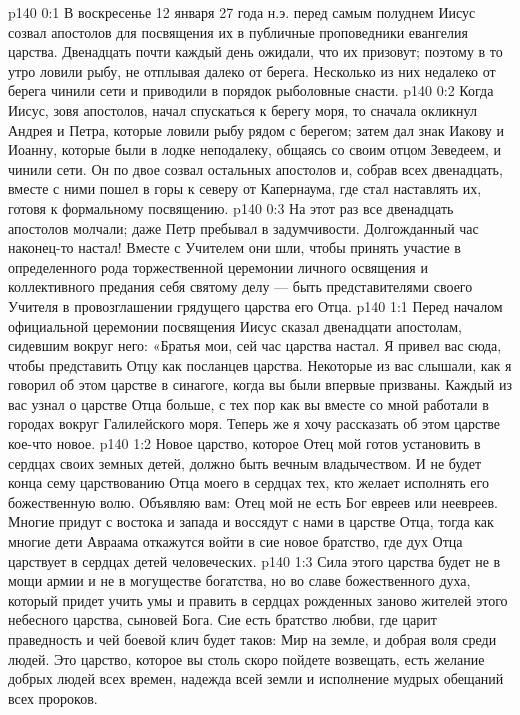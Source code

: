 \author{Комиссия срединников}
\vs p140 0:1 В воскресенье 12 января 27 года н.э. перед самым полуднем Иисус созвал апостолов для посвящения их в публичные проповедники евангелия царства. Двенадцать почти каждый день ожидали, что их призовут; поэтому в то утро ловили рыбу, не отплывая далеко от берега. Несколько из них недалеко от берега чинили сети и приводили в порядок рыболовные снасти.
\vs p140 0:2 Когда Иисус, зовя апостолов, начал спускаться к берегу моря, то сначала окликнул Андрея и Петра, которые ловили рыбу рядом с берегом; затем дал знак Иакову и Иоанну, которые были в лодке неподалеку, общаясь со своим отцом Зеведеем, и чинили сети. Он по двое созвал остальных апостолов и, собрав всех двенадцать, вместе с ними пошел в горы к северу от Капернаума, где стал наставлять их, готовя к формальному посвящению.
\vs p140 0:3 На этот раз все двенадцать апостолов молчали; даже Петр пребывал в задумчивости. Долгожданный час наконец\hyp{}то настал! Вместе с Учителем они шли, чтобы принять участие в определенного рода торжественной церемонии личного освящения и коллективного предания себя святому делу --- быть представителями своего Учителя в провозглашении грядущего царства его Отца.
\vs p140 1:1 Перед началом официальной церемонии посвящения Иисус сказал двенадцати апостолам, сидевшим вокруг него: «Братья мои, сей час царства настал. Я привел вас сюда, чтобы представить Отцу как посланцев царства. Некоторые из вас слышали, как я говорил об этом царстве в синагоге, когда вы были впервые призваны. Каждый из вас узнал о царстве Отца больше, с тех пор как вы вместе со мной работали в городах вокруг Галилейского моря. Теперь же я хочу рассказать об этом царстве кое\hyp{}что новое.
\vs p140 1:2 Новое царство, которое Отец мой готов установить в сердцах своих земных детей, должно быть вечным владычеством. И не будет конца сему царствованию Отца моего в сердцах тех, кто желает исполнять его божественную волю. Объявляю вам: Отец мой не есть Бог евреев или неевреев. Многие придут с востока и запада и воссядут с нами в царстве Отца, тогда как многие дети Авраама откажутся войти в сие новое братство, где дух Отца царствует в сердцах детей человеческих.
\vs p140 1:3 Сила этого царства будет не в мощи армии и не в могуществе богатства, но во славе божественного духа, который придет учить умы и править в сердцах рожденных заново жителей этого небесного царства, сыновей Бога. Сие есть братство любви, где царит праведность и чей боевой клич будет таков: Мир на земле, и добрая воля среди людей. Это царство, которое вы столь скоро пойдете возвещать, есть желание добрых людей всех времен, надежда всей земли и исполнение мудрых обещаний всех пророков.
